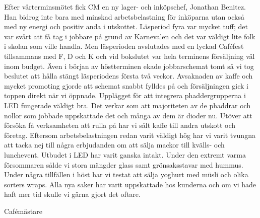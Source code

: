 \documentclass[../_main/handlingar.tex]{subfiles}
\begin{document}
Efter vårterminsmötet fick CM en ny lager- och inköpschef, Jonathan Benitez. Han bidrog inte bara med minskad arbetsbelastning för inköparna utan också med ny energi och positiv anda i utskottet. Läsperiod fyra var mycket tuff; det var svårt att få tag i jobbare på grund av Karnevalen och det var väldigt lite folk i skolan som ville handla. Men läsperioden avslutades med en lyckad Caféfest tillsammans med F, D och K och vid bokslutet var hela terminens försäljning väl inom budget. 
Även i början av höstterminen ekade jobbarschemat tomt så vi tog beslutet att hålla stängt läsperiodens första två veckor. Avsaknaden av kaffe och mycket promoting gjorde att schemat snabbt fylldes på och försäljningen gick i toppen direkt när vi öppnade. Upplägget för att integrera phaddergrupperna i LED fungerade väldigt bra. Det verkar som att majoriteten av de phaddrar och nollor som jobbade uppskattade det och många av dem är dioder nu. 
Utöver att försöka få verksamheten att rulla på har vi sålt kaffe till andra utskott och företag. Eftersom arbetsbelastningen redan varit väldigt hög har vi varit tvungna att tacka nej till några erbjudanden om att sälja mackor till kvälls- och lunchevent. 
Utbudet i LED har varit ganska intakt. Under den extremt varma försommaren sålde vi stora mängder glass samt grönsaksstavar med hummus.  Under några tillfällen i höst har vi testat att sälja yoghurt med müsli och olika sorters wraps. Alla nya saker har varit uppskattade hos kunderna och om vi hade haft mer tid skulle vi gärna gjort det oftare.
\begin{signatures}{1}
    \mvh
    \signature{Elin Johansson}{Cafémästare}
\end{signatures}
\end{document}
